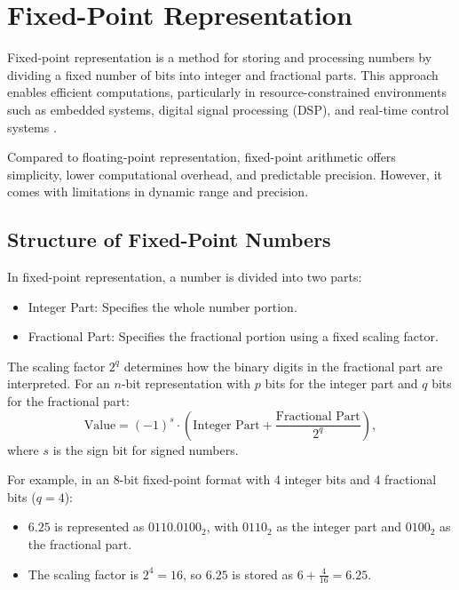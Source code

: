 \section{Fixed-Point Representation}
Fixed-point representation is a method for storing and processing numbers by dividing a fixed number of bits into integer and fractional parts. This approach enables efficient computations, particularly in resource-constrained environments such as embedded systems, digital signal processing (DSP), and real-time control systems \cite{lathi2005digital}.

Compared to floating-point representation, fixed-point arithmetic offers simplicity, lower computational overhead, and predictable precision. However, it comes with limitations in dynamic range and precision.

\subsection{Structure of Fixed-Point Numbers}
In fixed-point representation, a number is divided into two parts:
\begin{itemize}[noitemsep]
    \item Integer Part: Specifies the whole number portion.
    \item Fractional Part: Specifies the fractional portion using a fixed scaling factor.
\end{itemize}

The scaling factor \( 2^q \) determines how the binary digits in the fractional part are interpreted. For an \( n \)-bit representation with \( p \) bits for the integer part and \( q \) bits for the fractional part:
\[
\text{Value} = (-1)^s \cdot \left( \text{Integer Part} + \frac{\text{Fractional Part}}{2^q} \right),
\]
where \( s \) is the sign bit for signed numbers.

For example, in an 8-bit fixed-point format with 4 integer bits and 4 fractional bits (\( q = 4 \)):
\begin{itemize}[noitemsep]
    \item \( 6.25 \) is represented as \( 0110.0100_2 \), with \( 0110_2 \) as the integer part and \( 0100_2 \) as the fractional part.
    \item The scaling factor is \( 2^4 = 16 \), so \( 6.25 \) is stored as \( 6 + \frac{4}{16} = 6.25 \).
\end{itemize}


